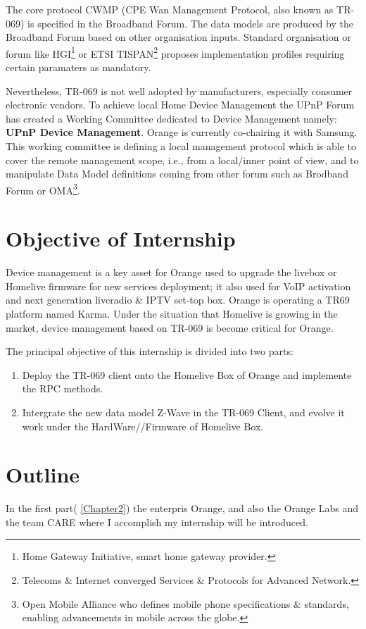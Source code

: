 The core protocol CWMP (CPE Wan Management Protocol, also known as TR-069) is specified in the Broadband Forum. The data models are produced by the Broadband Forum based on other organisation inputs. Standard organisation or forum like HGI\footnote{Home Gateway Initiative, smart home gateway provider.} or ETSI TISPAN\footnote{Telecoms \& Internet converged Services \& Protocols for Advanced Network.} proposes implementation profiles requiring certain paramaters as mandatory.

Nevertheless, TR-069 is not well adopted by manufacturers, especially consumer electronic vendors. To achieve local Home Device Management the UPnP Forum has created a Working Committee dedicated to Device Management namely: \textbf{UPnP Device Management}. Orange is currently co-chairing it with Samsung. This working committee is defining a local management protocol which is able to cover the remote management scope, i.e., from a local/inner point of view, and to manipulate Data Model definitions coming from other forum such as Brodband Forum or OMA\footnote{Open Mobile Alliance who defines mobile phone specifications \& standards, enabling advancements in mobile across the globe.}.
\section{Objective of Internship}

Device management is a key asset for Orange used to upgrade the livebox or Homelive firmware for new services deployment; it also used for VoIP activation and next generation liveradio \& IPTV set-top box. Orange is operating a TR69 platform named Karma. Under the situation that Homelive is growing in the market, device management based on TR-069 is become critical for Orange.

The principal objective of this internship is divided into two parts:
\begin{enumerate}
\it
\item Deploy the TR-069 client onto the Homelive Box of Orange and implemente the RPC methods.
\item Intergrate the new data model Z-Wave in the TR-069 Client, and evolve it work under the HardWare//Firmware of Homelive Box.
\end{enumerate}

\section{Outline}
In the first part( \autoref{Chapter2}) the enterpris Orange, and also the Orange Labs and the team CARE where I accomplish my internship will be introduced.

